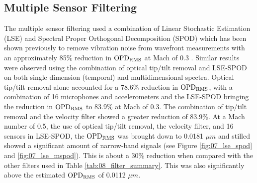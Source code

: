 \subsection{Multiple Sensor Filtering}
The multiple sensor filtering used a combination of Linear Stochastic Estimation (LSE) and Spectral Proper Orthogonal Decomposition (SPOD) which has been shown previously to remove vibration noise from wavefront measurements with an approximately 85\% reduction in $\operatorname{OPD_{RMS}}$ at Mach of 0.3 \cite{DeLucca-2014-RAJvGdv7}.
Similar results were observed using the combination of optical tip/tilt removal and LSE-SPOD on both single dimension (temporal) and multidimensional spectra.
Optical tip/tilt removal alone accounted for a 78.6\% reduction in $\operatorname{OPD_{RMS}}$, with a combination of 16 microphones and accelerometers and the LSE-SPOD bringing the reduction in $\operatorname{OPD_{RMS}}$ to 83.9\% at Mach of 0.3.
The combination of tip/tilt removal and the velocity filter showed a greater reduction of 83.9\%.
At a Mach number of 0.5, the use of optical tip/tilt removal, the velocity filter, and 16 sensors in LSE-SPOD, the $\operatorname{OPD_{RMS}}$ was brought down to 0.0181 $\mu m$ and stilled showed a significant amount of narrow-band signals (see Figure \ref{fig:07_lse_spod} and \ref{fig:07_lse_mspod}).
This is about a 30\% reduction when compared with the other filters used in Table \ref{tab:08_filter_summary}.
This was also significantly above the estimated $\operatorname{OPD_{RMS}}$ of 0.0112 $\mu m$.

